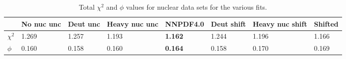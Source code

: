 \begin{table}[h]
  \centering
  \scriptsize
  \renewcommand{\arraystretch}{1}
  \begin{tabularx}{\textwidth}{l|l|lll|lll}
    \toprule
   & No nuc unc   & Deut unc & Heavy nuc unc & {\bf NNPDF4.0 } & Deut shift  & Heavy nuc shift & Shifted   \\
   \midrule
 {\bf $\chi^2$ } & 1.269 & 1.257 & 1.193 & {\bf 1.162 }  & 1.244  & 1.196 & 1.166  \\
 {\bf $\phi$ } & 0.160 & 0.158 & 0.160   & {\bf 0.164} & 0.158  &  0.170 & 0.169\\
    \bottomrule
  \end{tabularx}
  \caption{Total $\chi^2$ and $\phi$ values for nuclear data sets for the various fits. \label{tab:totchi2} }
  
\end{table}


